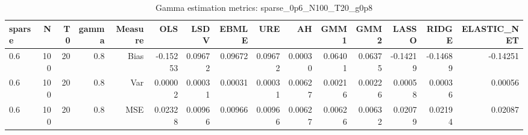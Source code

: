 \begin{table}[!htbp]\centering
\caption{Gamma estimation metrics: sparse_0p6_N100_T20_g0p8}
\label{tab:table1_sparse_0p6_N100_T20_g0p8}
\begin{tabular}{lrrrrrrrrrrrrrr}
\hline
sparse & N & T0 & gamma & Measure & OLS & LSDV & EBMLE & URE & AH & GMM1 & GMM2 & LASSO & RIDGE & ELASTIC_NET \\
\hline
0.6 & 100 & 20 & 0.8 & Bias & -0.15253 & 0.09672 & 0.09672 & 0.09672 & 0.00030 & 0.06401 & 0.06375 & -0.14219 & -0.14689 & -0.14251 \\
0.6 & 100 & 20 & 0.8 & Var & 0.00002 & 0.00031 & 0.00031 & 0.00031 & 0.00627 & 0.00216 & 0.00226 & 0.00058 & 0.00036 & 0.00056 \\
0.6 & 100 & 20 & 0.8 & MSE & 0.02328 & 0.00966 & 0.00966 & 0.00966 & 0.00627 & 0.00626 & 0.00632 & 0.02079 & 0.02194 & 0.02087 \\
\hline
\end{tabular}
\end{table}

